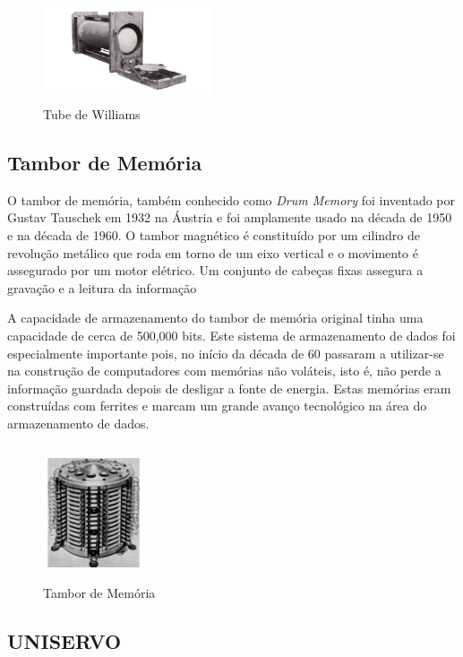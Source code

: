 \documentclass{report}
\begin{document}
	\begin{figure}[b]
		\centering
		\includegraphics[width=5cm, height=3cm]{williamstube.jpg}
		\caption{Tube de Williams}
		\end{figure}	
\newpage

		
		\subsection{Tambor de Memória}
		 O tambor de memória, também conhecido como\textit{ Drum Memory} foi inventado por Gustav Tauschek em 1932 na Áustria e foi amplamente usado na década de 1950 e na década de 1960.
		 O tambor magnético é constituído por um cilindro de revolução metálico que roda em torno de um eixo vertical e o movimento é assegurado por um motor elétrico. Um conjunto de cabeças fixas assegura a gravação e a leitura da informação
		 
		 A capacidade de armazenamento do tambor de memória original tinha uma capacidade de cerca de 500,000 bits. Este sistema de armazenamento de dados foi especialmente importante pois, no início da década de 60 passaram a utilizar-se na construção de computadores com memórias não voláteis, isto é, não perde a informação guardada depois de desligar a fonte de energia. Estas memórias eram construídas com ferrites e marcam um grande avanço tecnológico na área do armazenamento de dados.
	
	\begin{figure}[b]
		\centering
		\includegraphics[width=3cm, height=4cm]{tambordememoria.jpg}
		\caption{Tambor de Memória}
		\end{figure}

\newpage
	\subsection{UNISERVO}
\end{document}
